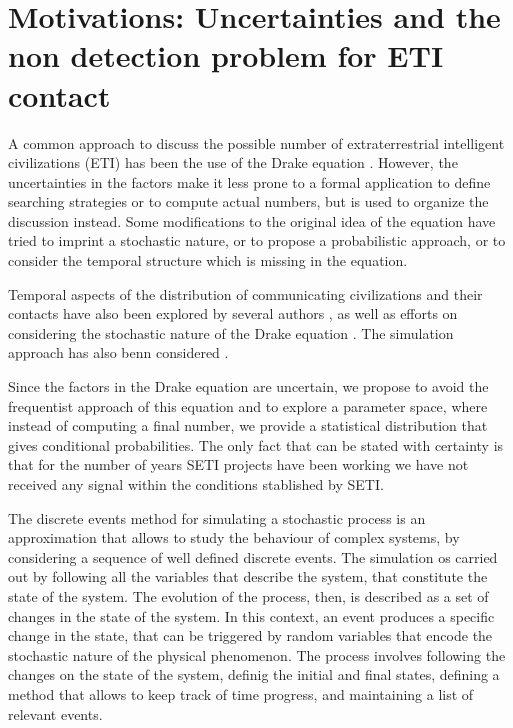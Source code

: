 \documentclass[crop]{CSLB}%
\begin{document}
\Fpagebreak





\section{Motivations: Uncertainties and the non detection problem for
ETI contact}

A common approach to discuss the possible number of extraterrestrial
intelligent civilizations (ETI) has been the use of the Drake equation
\citep{Gleiser2010, Prantzos2013, Haqq-Misra2017}.
%
However, the uncertainties in the factors make it less prone to a
formal application to define searching strategies or to compute
actual numbers, but is used to organize the discussion instead.
%
Some modifications to the original idea of the equation have tried to
imprint a stochastic nature, or to propose a probabilistic approach,
or to consider the temporal structure which is missing in the
equation.




%
Temporal aspects of the distribution of communicating civilizations
and their contacts have also been explored by several authors
\citep{Fogg1987, Forgan2011, Balbi2018},
%
as well as efforts on considering the stochastic nature of the Drake equation
\citep{Glade2011}.
%
The simulation approach has also benn considered
\citep{Forgan2008, Forgan2010}.



Since the factors in the Drake equation are uncertain, we propose to
avoid the frequentist approach of this equation
and to explore a parameter space, where instead of computing a final
number, we provide a statistical distribution that gives conditional
probabilities.
%
The only fact that can be stated with certainty is that for the number
of years SETI projects have been working we have not received any
signal within the conditions stablished by SETI.



The discrete events method for simulating a stochastic process is an
approximation that allows to study the behaviour of complex
systems, by considering a sequence of well defined discrete events.
%
The simulation os carried out by following all the variables that
describe the system, that constitute the state of the system.
%
The evolution of the process, then, is described as a set of changes
in the state of the system.
%
In this context, an event produces a specific change in the state,
that can be triggered by random variables that encode the stochastic
nature of the physical phenomenon.
%
The process involves following the changes on the state of the system,
definig the initial and final states, defining a method that allows to
keep track of time progress, and maintaining a list of relevant
events.
\end{document}
